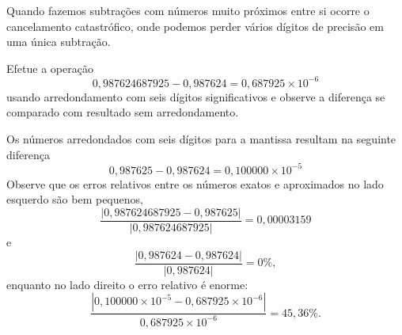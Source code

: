 Quando fazemos subtrações com números muito próximos entre si ocorre o cancelamento catastrófico, onde podemos perder vários dígitos de precisão em uma única subtração.

\begin{ex}Efetue a operação
  \begin{equation*}
    0,987624687925-0,987624=0,687925\times 10^{-6}    
  \end{equation*}
usando arredondamento com seis dígitos significativos e observe a diferença se comparado com resultado sem arredondamento.
\end{ex}
\begin{sol}
Os números arredondados com seis dígitos para a mantissa resultam na seguinte diferença
$$
0,987625-0,987624=0,100000\times 10^{-5}
$$
Observe que os erros relativos entre os números exatos e aproximados no lado esquerdo são bem pequenos,
\begin{equation*}
  \frac{|0,987624687925-0,987625|}{|0,987624687925|}=0,00003159  
\end{equation*}
e
\begin{equation*}
  \frac{|0,987624-0,987624|}{|0,987624|}=0\%,
\end{equation*}
enquanto no lado direito o erro relativo é enorme:
\begin{equation*}
\frac{|0,100000\times 10^{-5}-0,687925\times 10^{-6}|}{0,687925\times 10^{-6}}=45,36\%.  
\end{equation*}
\end{sol}

